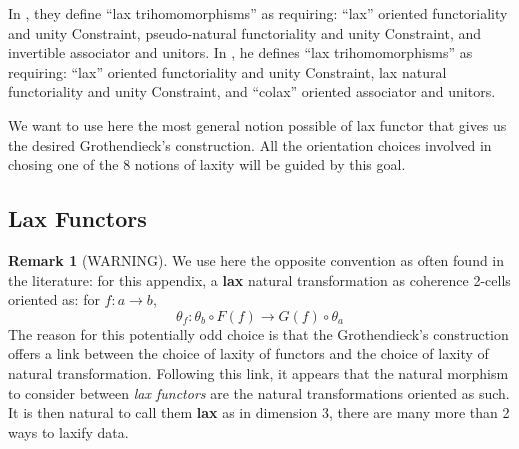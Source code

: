 \documentclass{article}
\numberwithin{equation}{section}
\theoremstyle{definition}
\newtheorem{remark}[equation]{Remark}
\theoremstyle{plain}
\begin{document}
In \cite{GARNER_2009}, they define ``lax trihomomorphisms'' as requiring: ``lax'' oriented functoriality and unity Constraint, pseudo-natural functoriality and unity Constraint, and invertible associator and unitors. In \cite{gurski_2013}, he defines ``lax trihomomorphisms'' as requiring: ``lax'' oriented functoriality and unity Constraint, lax natural functoriality and unity Constraint, and ``colax'' oriented associator and unitors.

We want to use here the most general notion possible of lax functor that gives us the desired Grothendieck's construction. All the orientation choices involved in chosing one of the 8 notions of laxity will be guided by this goal.

\subsection{Lax Functors}

\begin{remark}[WARNING] We use here the opposite convention as often found in the literature: for this appendix, a \textbf{lax} natural transformation as coherence 2-cells oriented as: for $f: a \to b$,
	\[\theta_f: \theta_b \circ F(f) \to G(f) \circ \theta_a\]
	The reason for this potentially odd choice is that the Grothendieck's construction offers a link between the choice of laxity of functors and the choice of laxity of natural transformation. Following this link, it appears that the natural morphism to consider between \textit{lax functors} are the natural transformations oriented as such. It is then natural to call them \textbf{lax} as in dimension 3, there are many more than 2 ways to laxify data.
\end{remark}
\end{document}
